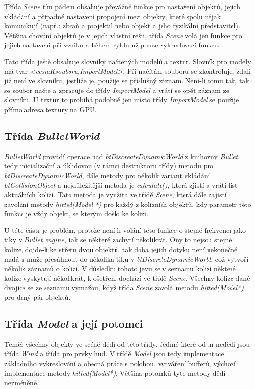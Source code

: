 Třída \emph{Scene} tím pádem obsahuje převážně funkce pro nastavení objektů, jejich vkládání a případné nastavení propojení mezi objekty, které spolu nějak komunikují (např.: zbraň a projektil nebo objekt a jeho fyzikální představitel). Většina chování objektů je v jejich vlastní režii, třída \emph{Scene} volá jen funkce pro jejich nastavení při vzniku a během cyklu už pouze vykreslovací funkce.  

Tato třída ještě obsahuje slovníky načtených modelů a textur. Slovník pro modely má tvar \emph{<cestaKsouboru,ImportModel>}. Při načítání souboru se zkontroluje, zdali již není ve slovníku, jestliže je, použije se příslušný záznam. Není-li tomu tak, tak se soubor načte a zpracuje do třídy \emph{ImportModel} a vrátí se opět záznam ze slovníku. U textur to probíhá podobně jen místo třídy \emph{ImportModel} se použije přímo adresa textury na GPU.
\subsection{Třída \emph{BulletWorld}}
\emph{BulletWorld} provádí operace nad \emph{btDiscreateDynamicWorld} z knihovny \emph{Bullet}\cite{bullet}, tedy inicializační a úklidovou (v rámci destruktoru třídy) metodu pro \emph{btDiscreateDynamicWorld}, dále metody pro několik variant vkládání \emph{btCollisionObject}
a nejdůležitější metoda je \emph{calculate()}, která zjistí a vrátí list aktuálních kolizí. Tato metoda je využita ve třídě \emph{Scene}, která dále zajistí zavolání metody \emph{hitted(Model *)} pro každý z kolizních objektů, kdy parametr této funkce je vždy objekt, se kterým došlo ke kolizi. 

U této části je problém, protože není-li volání této funkce o stejné frekvenci jako tiky v \emph{Bullet engine}, tak se některé  zachytí několikrát. Ony to nejsou stejné kolize, dojde-li ke střetu dvou objektů, tak doba jejich dotyku není nekonečně malá a může přesáhnout do několika tiků v \emph{btDiscreteDynamicWorld}, což vytvoří několik záznamů o kolizi.
V důsledku tohoto jevu se v seznamu kolizí některé kolize vyskytují několikrát, k ošetření dochází ve třídě \emph{ Scene}. Všechny kolize dané dvojice se ze seznamu vymažou, když třída \emph{Scene} zavolá metodu \emph{hitted(Model*)} pro daný pár objektů.
\subsection{Třída \emph{Model} a její potomci}
Téměř všechny objekty ve scéně dědí od této třídy. Jediné které od ní nedědí jsou třída \emph{Wind} a třída pro prvky hud. V třídě \emph{Model} jsou tedy implementace základního vykreslování a obecná práce s polohou, vytváření bufferů, výchozí implementace metody \emph{hitted(Model*)}. Většina potomků tyto metody dědí nezměněné.

